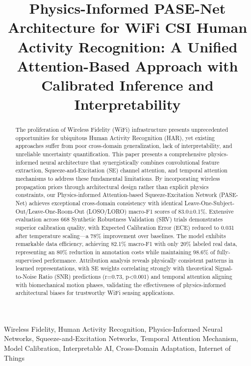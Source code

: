 \documentclass[journal]{IEEEtran}
\begin{document}
\title{Physics-Informed PASE-Net Architecture for WiFi CSI Human Activity Recognition: A Unified Attention-Based Approach with Calibrated Inference and Interpretability}

\author{
}

\maketitle

\begin{abstract}
The proliferation of Wireless Fidelity (WiFi) infrastructure presents unprecedented opportunities for ubiquitous Human Activity Recognition (HAR), yet existing approaches suffer from poor cross-domain generalization, lack of interpretability, and unreliable uncertainty quantification. This paper presents a comprehensive physics-informed neural architecture that synergistically combines convolutional feature extraction, Squeeze-and-Excitation (SE) channel attention, and temporal attention mechanisms to address these fundamental limitations. By incorporating wireless propagation priors through architectural design rather than explicit physics constraints, our Physics-informed Attention-based Squeeze-Excitation Network (PASE-Net) achieves exceptional cross-domain consistency with identical Leave-One-Subject-Out/Leave-One-Room-Out (LOSO/LORO) macro-F1 scores of 83.0±0.1\%. Extensive evaluation across 668 Synthetic Robustness Validation (SRV) trials demonstrates superior calibration quality, with Expected Calibration Error (ECE) reduced to 0.031 after temperature scaling—a 78\% improvement over baselines. The model exhibits remarkable data efficiency, achieving 82.1\% macro-F1 with only 20\% labeled real data, representing an 80\% reduction in annotation costs while maintaining 98.6\% of fully-supervised performance. Attribution analysis reveals physically consistent patterns in learned representations, with SE weights correlating strongly with theoretical Signal-to-Noise Ratio (SNR) predictions (r=0.73, p<0.001) and temporal attention aligning with biomechanical motion phases, validating the effectiveness of physics-informed architectural biases for trustworthy WiFi sensing applications.
\end{abstract}

\begin{IEEEkeywords}
Wireless Fidelity, Human Activity Recognition, Physics-Informed Neural Networks, Squeeze-and-Excitation Networks, Temporal Attention Mechanism, Model Calibration, Interpretable AI, Cross-Domain Adaptation, Internet of Things
\end{IEEEkeywords}
\end{document}
